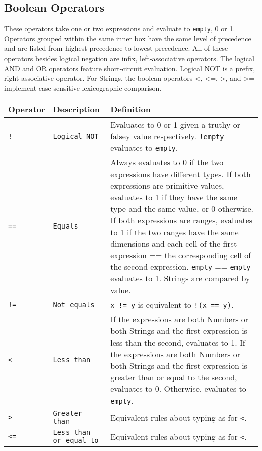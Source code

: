 		\subsection{Boolean Operators}
			These operators take one or two expressions and evaluate to \texttt{empty}, 0 or 1. Operators grouped within the same inner box have the same level of precedence and are listed from highest precedence to lowest precedence. All of these operators besides logical negation are infix, left-associative operators. The logical AND and OR operators feature short-circuit evaluation. Logical NOT is a prefix, right-associative operator. For Strings, the boolean operators <, <=, >, and >= implement case-sensitive lexicographic comparison.
			\begin{table}[H]
			\begin{tabular}{ |p{2cm}|p{5cm}|p{7cm}|  }
			\hline
			\textbf{Operator} & \textbf{Description} & \textbf{Definition} \\ \hline
			\rule{0pt}{3ex}\texttt{!} & \texttt{Logical NOT} & {Evaluates to 0 or 1 given a truthy or falsey value respectively. \texttt{!empty} evaluates to \texttt{empty}.} \\ \hline
			\rule{0pt}{3ex}\texttt{==} & \texttt{Equals} & {Always evaluates to 0 if the two expressions have different types. If both expressions are primitive values, evaluates to 1 if they have the same type and the same value, or 0 otherwise. If both expressions are ranges, evaluates to 1 if the two ranges have the same dimensions and each cell of the first expression == the corresponding cell of the second expression. \texttt{empty} == \texttt{empty} evaluates to 1. Strings are compared by value.} \\
			\rule{0pt}{3ex}\texttt{!=} & \texttt{Not equals} & {\texttt{x != y} is equivalent to \texttt{!(x == y)}.} \\
			\rule{0pt}{3ex}\texttt{<} & \texttt{Less than} & {If the expressions are both Numbers or both Strings and the first expression is less than the second, evaluates to 1. If the expressions are both Numbers or both Strings and the first expression is greater than or equal to the second, evaluates to 0. Otherwise, evaluates to \texttt{empty}.} \\
			\rule{0pt}{3ex}\texttt{>} & \texttt{Greater than} & {Equivalent rules about typing as for \texttt{<}.} \\
			\rule{0pt}{3ex}\texttt{<=} & \texttt{Less than or equal to} & {Equivalent rules about typing as for \texttt{<}.} \\

\end{tabular}
\end{table}
